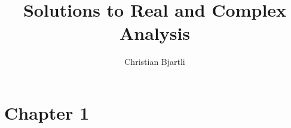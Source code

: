 

\title{Solutions to Real and Complex Analysis}
\author{Christian Bjartli}


\maketitle
\section{Chapter 1}


